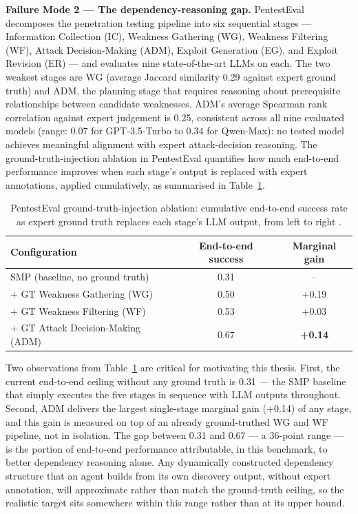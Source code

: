 \textbf{Failure Mode 2 --- The dependency-reasoning gap.} PentestEval \citep{yang2025pentesteval} decomposes the penetration testing pipeline into six sequential stages --- Information Collection (IC), Weakness Gathering (WG), Weakness Filtering (WF), Attack Decision-Making (ADM), Exploit Generation (EG), and Exploit Revision (ER) --- and evaluates nine state-of-the-art LLMs on each. The two weakest stages are WG (average Jaccard similarity 0.29 against expert ground truth) and ADM, the planning stage that requires reasoning about prerequisite relationships between candidate weaknesses. ADM's average Spearman rank correlation against expert judgement is 0.25, consistent across all nine evaluated models (range: 0.07 for GPT-3.5-Turbo to 0.34 for Qwen-Max): no tested model achieves meaningful alignment with expert attack-decision reasoning. The ground-truth-injection ablation in PentestEval quantifies how much end-to-end performance improves when each stage's output is replaced with expert annotations, applied cumulatively, as summarised in Table~\ref{tab:pentesteval-ablation}.

\begin{table}[htbp]
	\centering
	\caption{PentestEval ground-truth-injection ablation: cumulative end-to-end success rate as expert ground truth replaces each stage's LLM output, from left to right \citep{yang2025pentesteval}.}
	\label{tab:pentesteval-ablation}
	\begin{tabular}{@{}lcc@{}}
		\toprule
		\textbf{Configuration}                  & \textbf{End-to-end success} & \textbf{Marginal gain} \\
		\midrule
		SMP (baseline, no ground truth)         & 0.31                        & --                     \\
		\quad + GT Weakness Gathering (WG)      & 0.50                        & +0.19                  \\
		\quad + GT Weakness Filtering (WF)      & 0.53                        & +0.03                  \\
		\quad + GT Attack Decision-Making (ADM) & 0.67                        & \textbf{+0.14}         \\
		\bottomrule
	\end{tabular}
\end{table}

Two observations from Table~\ref{tab:pentesteval-ablation} are critical for motivating this thesis. First, the current end-to-end ceiling without any ground truth is 0.31 --- the SMP baseline that simply executes the five stages in sequence with LLM outputs throughout. Second, ADM delivers the largest single-stage marginal gain (+0.14) of any stage, and this gain is measured on top of an already ground-truthed WG and WF pipeline, not in isolation. The gap between 0.31 and 0.67 --- a 36-point range --- is the portion of end-to-end performance attributable, in this benchmark, to better dependency reasoning alone. Any dynamically constructed dependency structure that an agent builds from its own discovery output, without expert annotation, will approximate rather than match the ground-truth ceiling, so the realistic target sits somewhere within this range rather than at its upper bound.


